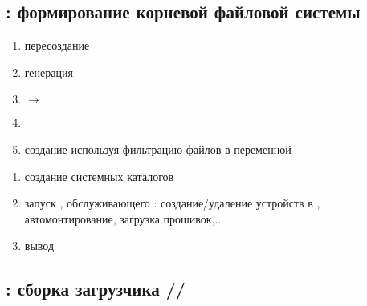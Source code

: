 \subsection{: формирование корневой файловой системы} \label{azroot}


\begin{enumerate}
  \item пересоздание 
  \item генерация  
  \item {} $\rightarrow$ 
  \item {}
  \item создание  используя фильтрацию файлов  в переменной 
\end{enumerate}



\begin{enumerate}
  \item создание системных каталогов
  \item запуск  , обслуживающего :
  создание/удаление устройств в , автомонтирование, загрузка
  прошивок,..
  \item вывод 
\end{enumerate}


\subsection{: сборка загрузчика
//} \label{azboot}


\subsubsection{}

\subsubsection{}

